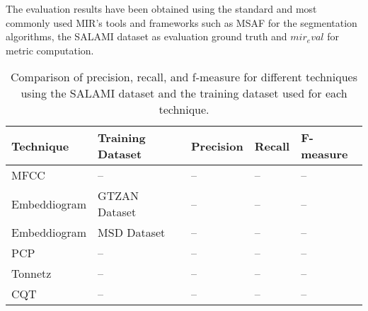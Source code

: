
The evaluation results have been obtained using the standard and most commonly used MIR's tools and frameworks such as MSAF \cite{NietoMSAF:FRAMEWORK} for the segmentation algorithms, the SALAMI dataset \cite{Smith2011DESIGNANNOTATIONS} as evaluation ground truth and $mir_eval$ \cite{RaffelMir_eval:METRICS} for metric computation.


\begin{table}[h]
\centering
\begin{tabularx}{\textwidth}{|X|X|X|X|X|}
\hline
\textbf{Technique} & \textbf{Training Dataset} & \textbf{Precision} & \textbf{Recall} & \textbf{F-measure} \\
\hline
MFCC & -- & -- & -- & -- \\
\hline
Embeddiogram & GTZAN Dataset & -- & -- & -- \\
\hline
Embeddiogram & MSD Dataset & -- & -- & -- \\
\hline
PCP & -- & -- & -- & -- \\
\hline
Tonnetz & -- & -- & -- & -- \\
\hline
CQT & -- & -- & -- & -- \\
\hline
\end{tabularx}
\caption{Comparison of precision, recall, and f-measure for different techniques using the SALAMI dataset and the training dataset used for each technique.}
\label{tab:comparison}
\end{table}




